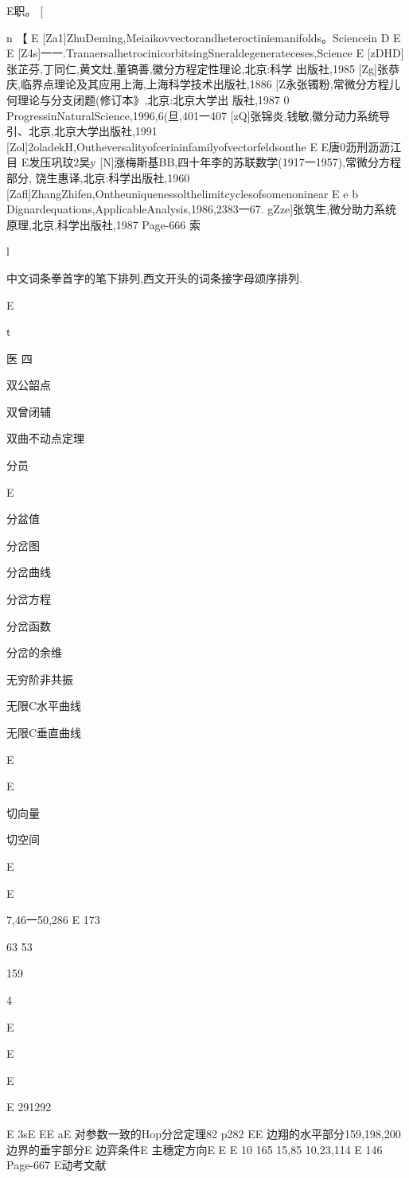 E职。
[

n
【
E
[Za1]ZhuDeming,Meiaikovvectorandheteroctiniemanifolds。Sciencein
D
E
E
[Z4s]一一.TranaersalhetrocinicorbitsingSneraldegenerateceses,Science
E
[zDHD]张芷芬,丁同仁,黄文灶,董镐善,徽分方程定性理论,北京:科学
出版社,1985
[Zg]张恭庆,临界点理论及其应用上海,上海科学技术出版社,1886
[Z永张镯粉,常微分方程儿何理论与分支闭题(修订本》,北京:北京大学出
版社,1987
0
ProgressinNaturalScience,1996,6(旦,401一407
[zQ]张锦炎,钱敏,徽分动力系统导引、北京,北京大学出版社,1991
[Zol]2oladekH,Outheversalityofceriainfamilyofvectorfeldsonthe
E
E唐0沥刑沥沥江目
E发压巩玟2吴y
[N]涨梅斯基BB,四十年李的苏联数学(1917一1957),常微分方程部分,
饶生惠译,北京:科学出版社,1960
[Zafl]ZhangZhifen,Ontheuniquenessolthelimitcyclesofsomenoninear
E
e
b
Dignardequations,ApplicableAnalysis,1986,2383一67.
gZze]张筑生,微分助力系统原理,北京,科学出版社,1987
Page-666
索

l

中文词条拳首字的笔下排列,西文开头的词条接字母颂序排列.

E

t

医
四

双公韶点

双曾闭辅

双曲不动点定理

分员

E

分盆值

分岔图

分岔曲线

分岔方程

分岔函数

分岔的余维

无穷阶非共振

无限C水平曲线

无限C垂直曲线

E

E

切向量

切空间

E

E

7,46一50,286
E
173

63
53

159

4

E

E

E

E
291292

E
3sE
EE
aE
对参数一致的Hop分岔定理82
p282
EE
边翔的水平部分159,198,200
边界的垂宇部分E
边弈条件E
主穗定方向E
E
E
10
165
15,85
10,23,114
E
146
Page-667
E动考文献

